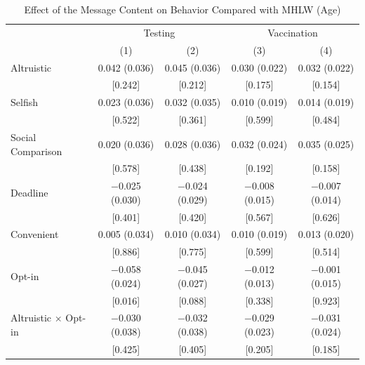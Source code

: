 \documentclass[
    a4paper
]{article}
\begin{document}
\begin{table}

\caption{\label{tab:reg-act-woA}Effect of the Message Content on Behavior Compared with MHLW (Age)}
\centering
\fontsize{9}{11}\selectfont
\begin{threeparttable}
\begin{tabular}[t]{lcccc}
\toprule
\multicolumn{1}{c}{ } & \multicolumn{2}{c}{Testing} & \multicolumn{2}{c}{Vaccination} \\
\cmidrule(l{3pt}r{3pt}){2-3} \cmidrule(l{3pt}r{3pt}){4-5}
  & (1) & (2) & (3) & (4)\\
\midrule
Altruistic & \num{0.042} (\num{0.036}) & \num{0.045} (\num{0.036}) & \num{0.030} (\num{0.022}) & \num{0.032} (\num{0.022})\\
 & {}[\num{0.242}] & {}[\num{0.212}] & {}[\num{0.175}] & {}[\num{0.154}]\\
Selfish & \num{0.023} (\num{0.036}) & \num{0.032} (\num{0.035}) & \num{0.010} (\num{0.019}) & \num{0.014} (\num{0.019})\\
 & {}[\num{0.522}] & {}[\num{0.361}] & {}[\num{0.599}] & {}[\num{0.484}]\\
Social Comparison & \num{0.020} (\num{0.036}) & \num{0.028} (\num{0.036}) & \num{0.032} (\num{0.024}) & \num{0.035} (\num{0.025})\\
 & {}[\num{0.578}] & {}[\num{0.438}] & {}[\num{0.192}] & {}[\num{0.158}]\\
Deadline & \num{-0.025} (\num{0.030}) & \num{-0.024} (\num{0.029}) & \num{-0.008} (\num{0.015}) & \num{-0.007} (\num{0.014})\\
 & {}[\num{0.401}] & {}[\num{0.420}] & {}[\num{0.567}] & {}[\num{0.626}]\\
Convenient & \num{0.005} (\num{0.034}) & \num{0.010} (\num{0.034}) & \num{0.010} (\num{0.019}) & \num{0.013} (\num{0.020})\\
 & {}[\num{0.886}] & {}[\num{0.775}] & {}[\num{0.599}] & {}[\num{0.514}]\\
Opt-in & \num{-0.058} (\num{0.024}) & \num{-0.045} (\num{0.027}) & \num{-0.012} (\num{0.013}) & \num{-0.001} (\num{0.015})\\
 & {}[\num{0.016}] & {}[\num{0.088}] & {}[\num{0.338}] & {}[\num{0.923}]\\
Altruistic $\times$ Opt-in & \num{-0.030} (\num{0.038}) & \num{-0.032} (\num{0.038}) & \num{-0.029} (\num{0.023}) & \num{-0.031} (\num{0.024})\\
 & {}[\num{0.425}] & {}[\num{0.405}] & {}[\num{0.205}] & {}[\num{0.185}]\\

\end{tabular}
\end{threeparttable}
\end{table}
\end{document}
